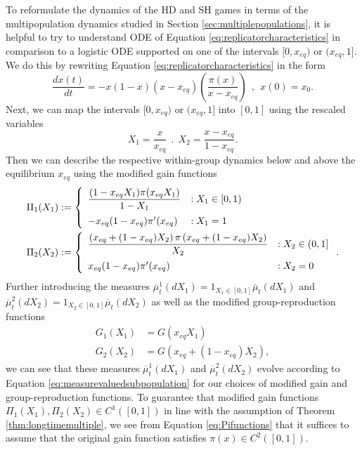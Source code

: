 \documentclass[11pt]{article}
\numberwithin{equation}{section}
\newcommand{\ds}{\displaystyle}
\newcommand{\ol}{\overline}
\newcommand{\dsddt}[1]{\displaystyle\frac{d #1}{dt}}
\begin{document}
{To reformulate the dynamics of the HD and SH games in terms of the multipopulation dynamics studied in Section \ref{sec:multiplepopulations},  
it is helpful to try to understand ODE of Equation \eqref{eq:replicatorcharacteristics} in comparison to a logistic ODE supported on one of the intervals $[0,x_{eq})$ or $(x_{eq},1]$. We do this by rewriting Equation \eqref{eq:replicatorcharacteristics} in the form
\begin{equation} \label{eq:replicatorcharacteristicsxeq}
    \dsddt{x(t)} = - x (1 - x) \left( x - x_{eq} \right) \left(\frac{\pi(x)}{x - x_{eq}} \right) \: \:, \: \: x(0) = x_0.
\end{equation}
Next, we can map the intervals $[0,x_{eq})$ or $(x_{eq},1]$ into $[0,1]$ using the rescaled variables 
\begin{equation} X_1 = \frac{x}{x_{eq}}\: \:. \: \: X_2 = \frac{x - x_{eq}}{1 - x_{eq}}. \end{equation} 
Then we can describe the respective within-group dynamics below and above the equilibrium $x_{eq}$ using the modified gain functions
\begin{equation} \label{eq:Pifunctions}
\begin{aligned}
    \Pi_1(X_1) &:= \left\{
     \begin{array}{ll}
        \ds\frac{(1-x_{eq} X_1) \pi(x_{eq} X_1)}{1 - X_1} & : X_1 \in [0,1) \vspace{2mm} \\
        -x_{eq} (1-x_{eq}) \pi'(x_{eq}) & : X_1 = 1
     \end{array}
   \right.  \\
   \Pi_2(X_2) &:= \left\{
     \begin{array}{ll}
        \ds\frac{\left(x_{eq} + (1-x_{eq}) X_2 \right) \pi\left(x_{eq} + (1-x_{eq}) X_2\right)}{X_2} & : X_2 \in (0,1] \vspace{2mm} \\
        x_{eq} (1-x_{eq}) \pi'(x_{eq}) & : X_2 = 0
     \end{array}
   \right. .
   \end{aligned} 
\end{equation}
Further introducing the measures $\ol{\mu}_t^1(dX_1) = 1_{X_1 \in [0,1]}\ol{\mu}_t(dX_1)$ and $\ol{\mu}_t^2(dX_2) = 1_{X_2 \in [0,1]}\ol{\mu}_t(dX_2)$ as well as the modified group-reproduction functions
\begin{subequations}
\label{eq:Gfunctions}
\begin{align}
G_1(X_1) &= G(x_{eq} X_1) \\
G_2(X_2) &= G\left( x_{eq} + (1 - x_{eq}) X_2 \right),
\end{align}
\end{subequations}
we can see that these measures $\ol{\mu}_t^1(dX_1)$ and $\ol{\mu}_t^2(dX_2)$ evolve according to Equation \eqref{eq:measurevaluedsubpopulation} for our choices of modified gain and group-reproduction functions. To guarantee that modified gain functions $\Pi_1(X_1), \Pi_2(X_2) \in C^1([0,1])$ in line with the assumption of Theorem \ref{thm:longtimemultiple}, we see from Equation \eqref{eq:Pifunctions} that it suffices to assume that the original gain function satisfies $\pi(x) \in C^2([0,1])$.


}
\end{document}

